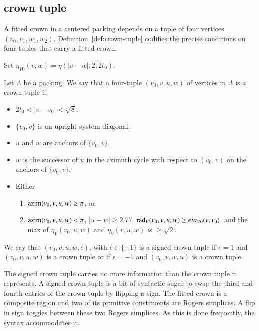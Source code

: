 \subsection{crown tuple}%
    \label{sec:deltaP}


A fitted crown in a centered packing depends on a tuple of
four vertices $(v_0,v_1,w_1,w_2)$.  Definition~\ref{def:crown-tuple} codifies
the precise conditions on four-tuples
that carry a fitted crown.

\begin{definition}[$\eta_{V0}$]\label{def:eta0}
Set $\eta_{V0}(v,w) = \eta(|v-w|,2,2t_0)$. 
\end{definition}



\begin{definition}\label{def:crown-tuple}
Let $\Lambda$ be a packing.
We say that a four-tuple $(v_0,v,u,w)$ of vertices in $\Lambda$   
is a crown tuple if
\begin{itemize}
  \item $2t_0 < |v-v_0| <\sqrt8$.
  \item $\{v_0,v\}$ is an upright system diagonal.
  \item $u$ and $w$ are anchors of $\{v_0,v\}$.
  \item $w$ is the successor of $u$ in the azimuth cycle with respect to
   $(v_0,v)$ on the
   anchors of $\{v_0,v\}$.
  \item Either
\begin{enumerate}  
    \item  ${\operatorname{azim}}(v_0,v,u,w)\ge\pi$, or
    \item ${\operatorname{azim}}(v_0,v,u,w) <\pi$, 
 $|u-w|\ge 2.77$,
    $\operatorname{rad}_V(v_0,v,u,w)\ge eta_{V0}(v,v_0)$, and the max of 
    $\eta_V(v_0,u,w)$ and $\eta_V(v,u,w)$ is
    $\ge\sqrt2$.
    \label{enum:wedge2}
\end{enumerate}
\end{itemize}
We say that $(v_0,v,u,w,\epsilon)$, with $\epsilon\in\{\pm1\}$ is
a signed crown tuple if $\epsilon=1$ and $(v_0,v,u,w)$ is a crown tuple
or if $\epsilon=-1$ and $(v_0,v,w,u)$ is a crown tuple.
\end{definition}

The signed crown tuple carries no more information than the crown
tuple it represents.  A signed crown tuple is a bit of
syntactic sugar to swap the third and fourth entries
of the crown tuple by flipping a sign.  The fitted crown is
a composite region and  two of its primitive constituents are
Rogers simplices.   A flip in sign toggles between these two Rogers
simplices.  As this is done frequently, the syntax accommodates it.

